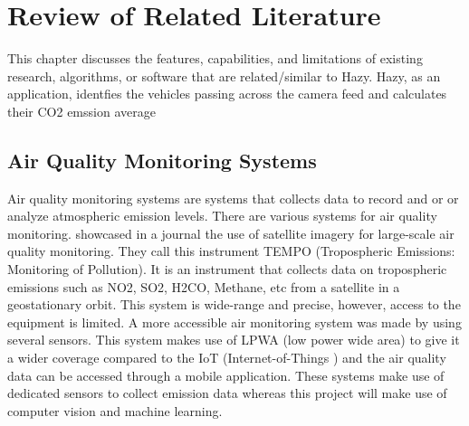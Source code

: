 \chapter{Review of Related Literature}
\label{sec:relatedlit}

This chapter discusses the features, capabilities, and limitations of existing research, algorithms, or software  that are related/similar to Hazy. Hazy, as an application, identfies the vehicles passing across the camera feed and calculates their CO2 emssion average


\begin{comment}
%
%
Guide on Writing your RRL chapter
 
1. Identify the keywords with respect to your research
      One keyword = One document section
                Examples: 2.1 Story Generation Systems
			 2.2 Knowledge Representation

2.  Find references using these keywords

3.  For each of the references that you find,
        Check: Is it relevant to your research?
        Use their references to find more relevant works.

4. Identify a set of criteria for comparison.
       It will serve as a guide to help you focus on what to look for

5. Write a summary focusing on -
       What: A short description of the work
       How: A summary of the approach it utilized
       Findings: If applicable, provide the results
        Why: Relevance to your work

6. At the end of each section,  show a Table of Comparison of the related works 
   and your proposed project/system

\end{comment}

\section{Air Quality Monitoring Systems}
Air quality monitoring systems are systems that collects data to record and or or analyze atmospheric emission levels. There are various systems for air quality monitoring. \cite{zoogman_2017} showcased in a journal the use of satellite imagery for large-scale air quality monitoring. They call this instrument TEMPO (Tropospheric Emissions: Monitoring of Pollution). It is an instrument that collects data on tropospheric emissions such as NO2, SO2, H2CO, Methane, etc from a satellite in a geostationary orbit. This system is wide-range and precise,  however, access to the equipment is limited.  A more accessible air monitoring system was made by \cite{zheng_2016} using several sensors. This system makes use of LPWA (low power wide area) to give it a wider coverage compared to the IoT (Internet-of-Things ) and the air quality data can be accessed through a mobile application. These systems make use of dedicated sensors to collect emission data whereas this project will make use of computer vision and machine learning.


